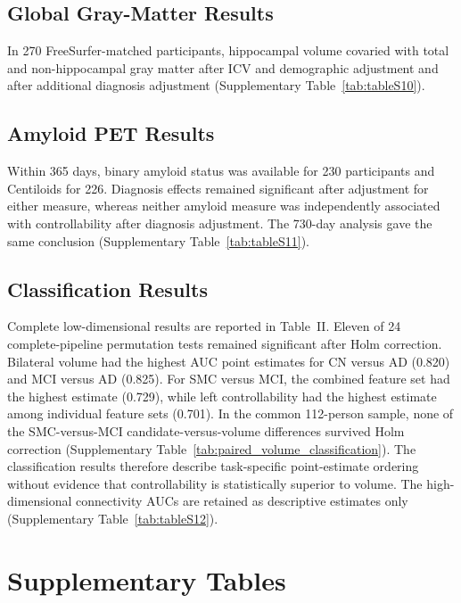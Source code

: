 \documentclass{article}
\begin{document}
\subsection{Global Gray-Matter Results}
In 270 FreeSurfer-matched participants, hippocampal volume covaried with total and non-hippocampal gray matter after ICV and demographic adjustment and after additional diagnosis adjustment (Supplementary Table~\ref{tab:tableS10}).

\subsection{Amyloid PET Results}
Within 365 days, binary amyloid status was available for 230 participants and Centiloids for 226. Diagnosis effects remained significant after adjustment for either measure, whereas neither amyloid measure was independently associated with controllability after diagnosis adjustment. The 730-day analysis gave the same conclusion (Supplementary Table~\ref{tab:tableS11}).

\subsection{Classification Results}
Complete low-dimensional results are reported in Table~II. Eleven of 24 complete-pipeline permutation tests remained significant after Holm correction. Bilateral volume had the highest AUC point estimates for CN versus AD (0.820) and MCI versus AD (0.825). For SMC versus MCI, the combined feature set had the highest estimate (0.729), while left controllability had the highest estimate among individual feature sets (0.701). In the common 112-person sample, none of the SMC-versus-MCI candidate-versus-volume differences survived Holm correction (Supplementary Table~\ref{tab:paired_volume_classification}). The classification results therefore describe task-specific point-estimate ordering without evidence that controllability is statistically superior to volume. The high-dimensional connectivity AUCs are retained as descriptive estimates only (Supplementary Table~\ref{tab:tableS12}).

\section{Supplementary Tables}
\end{document}
